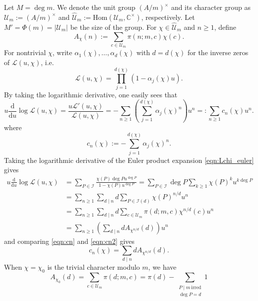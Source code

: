 \documentclass[10pt,reqno]{amsproc}
\newcommand{\what}[1]{\widehat{#1}}
\newcommand{\Hom}{\mathrm{Hom}}
\newcommand{\dd}{\mathrm{d}}
\newcommand{\bC}{\mathbb{C}}
\newcommand{\cI}{\mathcal{I}}
\newcommand{\cL}{\mathcal{L}}
\newcommand{\scU}{\mathscr{U}}
\newcommand{\1}{\mathds{1}}	%
\theoremstyle{definition}
\theoremstyle{remark}
\begin{document}
Let \(M = \deg m\). 
We denote the unit group \((A / m)^\times\) and its character group as \(\scU_m := (A / m)^\times\) and \(\what{\scU}_m := \Hom(\scU_m, \bC^\times)\), respectively.
Let $M' = \Phi(m) = |\scU_m|$ be the size of the group.
For \(\chi \in \what{\scU}_m\) and $n \ge 1$, define
\begin{equation}
\label{eqn:Achi}
A_\chi(n) := \sum_{c \in \scU_m} \pi(n; m, c) \chi(c).
\end{equation}
For nontrivial $\chi$, write $\alpha_1(\chi), \dots, \alpha_d(\chi)$ with $d = d(\chi)$ for the inverse zeros of $\cL(u, \chi)$, i.e.
\begin{equation}
    \cL(u, \chi) = \prod_{j=1}^{d(\chi)} (1 - \alpha_j(\chi) u).
\end{equation}
By taking the logarithmic derivative, one easily sees that
\begin{equation}
\label{eqn:Llogder}
    u \frac{\dd}{\dd u} \log \cL(u, \chi) = \frac{u \cL'(u, \chi)}{\cL(u, \chi)} = -\sum_{n \ge 1} \left(\sum_{j=1}^{d(\chi)}\alpha_j(\chi)^n\right) u^n =: \sum_{n \ge 1} c_n(\chi) u^n.
\end{equation}
where
\begin{equation}
\label{eqn:cn}
    c_n(\chi) := -\sum_{j=1}^{d(\chi)} \alpha_j(\chi)^n.
\end{equation}
Taking the logarithmic derivative of the Euler product expansion \eqref{eqn:Lchi_euler} gives
\begin{align}
    u \frac{\dd}{\dd u} \log \cL(u, \chi) &= \sum_{P \in \cI} \frac{\chi(P) \deg P u^{\deg P}}{1 - \chi(P) u^{\deg P}} = \sum_{P \in \cI} \deg P\sum_{k \ge 1} \chi(P)^k u^{k \deg P} \nonumber \\
    &= \sum_{n \ge 1} \sum_{d \mid n} d \sum_{P \in \cI(d)} \chi(P)^{n/d} u^n \nonumber \\
    &= \sum_{n \ge 1} \sum_{d \mid n} d \sum_{c \in \scU_m} \pi(d; m, c) \chi^{n/d}(c) u^n \nonumber \\
    &= \sum_{n \ge 1} \left(\sum_{d \mid n} d A_{\chi^{n/d}}(d)\right) u^n\label{eqn:cn2}
\end{align}
and comparing \eqref{eqn:cn} and \eqref{eqn:cn2} gives
\begin{equation}
\label{eqn:dAsum}
    c_n(\chi) = \sum_{d \mid n} d A_{\chi^{n/d}}(d).
\end{equation}
When $\chi = \chi_0$ is the trivial character modulo $m$, we have
\begin{equation}
    A_{\chi_0}(d) = \sum_{c \in \scU_m} \pi(d; m, c) = \pi(d) - \sum_{\substack{P \mid m\,\text{irred} \\ \deg P = d}} 1
\end{equation}
\end{document}

